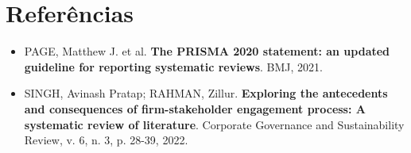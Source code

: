 \documentclass[12pt]{article}
\begin{document}
\section{Referências}
\label{sec:orgeaec8a5}

\begin{itemize}
\item PAGE, Matthew J. et al. \textbf{The PRISMA 2020 statement: an updated guideline for reporting systematic reviews}. BMJ, 2021.
\item SINGH, Avinash Pratap; RAHMAN, Zillur. \textbf{Exploring the antecedents and consequences of firm-stakeholder engagement process: A systematic review of literature}. Corporate Governance and Sustainability Review, v. 6, n. 3, p. 28-39, 2022.
\end{itemize}
\end{document}
